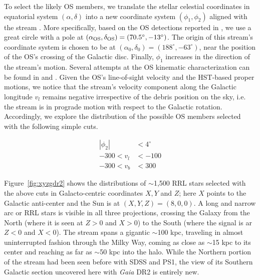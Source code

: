 \documentclass[a4paper,useAMS,usenatbib]{mnras}
\newcommand{\gaia}{\textit{Gaia} }
\begin{document}
To select the likely OS members, we translate the stellar celestial
coordinates in equatorial system $(\alpha, \delta)$ into a new
coordinate system $(\phi_1, \phi_2)$ aligned with the stream
\citep[see e.g.][]{Koposov2010}. More specifically, based on the OS
detections reported in \citet{OS_V, OS_C, Newberg2010}, we use a great
circle with a pole at $(\alpha_{\rm OS}, \delta_{\rm
  OS})=(70.5^{\circ}, -13^{\circ})$. The origin of this stream's
coordinate system is chosen to be at $(\alpha_0,
\delta_0)=(188^{\circ}, -63^{\circ})$, near the position of the OS's
crossing of the Galactic disc. Finally, $\phi_1$ increases in the
direction of the stream's motion. Several attempts at the OS kinematic
characterization can be found in \citet{Newberg2010} and
\citet{Sohn2016}. Given the OS's line-of-sight velocity and the
HST-based proper motions, we notice that the stream's velocity
component along the Galactic longitude $v_l$ remains negative
irrespective of the debris position on the sky, i.e. the stream is in
prograde motion with respect to the Galactic rotation. Accordingly, we
explore the distribution of the possible OS members selected with the
following simple cuts.

%
\begin{equation}
  \begin{aligned}
    |\phi_2| &< 4^{\circ}\\
    -300<v_l &<-100\\
    -300<v_b &<300
  \end{aligned}
\end{equation}
%

Figure~\ref{fig:xyzgdr2} shows the distributions of $\sim$1,500 RRL
stars selected with the above cuts in Galacto-centric coordinates
$X,Y$ and $Z$; here $X$ points to the Galactic anti-center and the Sun
is at $(X,Y,Z)=(8,0,0)$. A long and narrow arc or RRL stars is visible
in all three projections, crossing the Galaxy from the North (where it
is seen at $Z>0$ and $X>0$) to the South (where the signal is ar $Z<0$
and $X<0$). The stream spans a gigantic $\sim$100 kpc, traveling in
almost uninterrupted fashion through the Milky Way, coming as close as
$\sim$15 kpc to its center and reaching as far as $\sim$50 kpc into
the halo. While the Northern portion of the stream had been seen
before with SDSS and PS1, the view of its Southern Galactic section
uncovered here with \gaia DR2 is entirely new.
\end{document}
